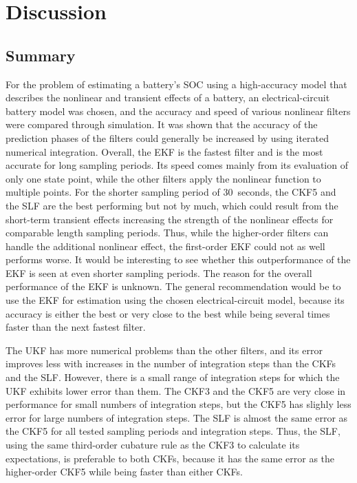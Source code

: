 \documentclass[../zhang_thesis.tex]{subfiles}
\begin{document}
\chapter{Discussion}


\section{Summary}

For the problem of estimating a battery's SOC using a high-accuracy model that describes the nonlinear and transient effects of a battery, an electrical-circuit battery model was chosen, and the accuracy and speed of various nonlinear filters were compared through simulation. It was shown that the accuracy of the prediction phases of the filters could generally be increased by using iterated numerical integration. Overall, the EKF is the fastest filter and is the most
accurate for long sampling periods. Its speed comes mainly from its evaluation of only one state point, while the other filters apply the nonlinear function to multiple points. For the shorter sampling period of 30~seconds, the CKF5 and the SLF are the best performing but not by much, which could result from the short-term transient effects increasing the strength of the nonlinear effects for comparable length sampling periods. Thus, while the higher-order filters can handle the
additional nonlinear effect, the first-order EKF could not as well performs worse. It would be interesting to see whether this outperformance of the EKF is seen at even shorter sampling periods. The reason for the overall performance of the EKF is unknown. The general recommendation would be to use the EKF for estimation using the chosen electrical-circuit model, because its accuracy is either the best or very close to the best while being several times faster than the next fastest
filter.

The UKF has more numerical problems than the other filters, and its error improves less with increases in the number of integration steps than the CKFs and the SLF. However, there is a small range of integration steps for which the UKF exhibits lower error than them. The CKF3 and the CKF5 are very close in performance for small numbers of integration steps, but the CKF5 has slighly less error for large numbers of integration steps. The SLF is almost the same error as the CKF5 for all tested sampling periods and integration steps. Thus, the SLF, using the same third-order cubature rule as the CKF3 to calculate its expectations, is preferable to both CKFs, because it has the same error as the higher-order CKF5 while being faster than either CKFs.
\end{document}
